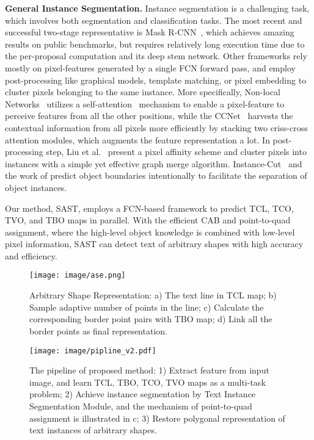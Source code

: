 \documentclass[sigconf]{acmart}
\begin{document}
\textbf{General Instance Segmentation.}
Instance segmentation is a challenging task, which involves both segmentation and classification tasks. 
The most recent and successful two-stage representative is Mask R-CNN~\cite{he2017mask}, which achieves amazing results on public benchmarks, but requires relatively long execution time due to the per-proposal computation and its deep stem network. Other frameworks rely mostly on pixel-features generated by a single FCN forward pass, and employ post-processing like graphical models, template matching, or pixel embedding to cluster pixels belonging to the same instance. More specifically, Non-local Networks~\cite{wang2018non} utilizes a self-attention~\cite{vaswani2017attention} mechanism to enable a pixel-feature to perceive features from all the other positions, while the CCNet~\cite{huang2018ccnet} harvests the contextual information from all pixels more efficiently by stacking two criss-cross attention modules, which augments the feature representation a lot. In post-processing step, Liu et al.~\cite{liu2018affinity} present a pixel affinity scheme and cluster pixels into instances with a simple yet effective graph merge algorithm. Instance-Cut~\cite{kirillov2017instancecut} and the work of \cite{yu2018learning} predict object boundaries intentionally to facilitate the separation of object instances.









Our method, SAST, employs a FCN-based framework to predict TCL, TCO, TVO, and TBO maps in parallel. With the efficient CAB and point-to-quad assignment, where the high-level object knowledge is combined with low-level pixel information, SAST can detect text of arbitrary shapes with high accuracy and efficiency.
\begin{figure}
  \texttt{[image: image/ase.png]}
  \caption{Arbitrary Shape Representation: a) The text line in TCL map; b) Sample adaptive number of points in the  line; c) Calculate the corresponding border point pairs with TBO map; d) Link all the border points as final representation. }
  \label{fig:ase}
\end{figure}



\begin{figure*}
\texttt{[image: image/pipline\_v2.pdf]}
  \caption{The pipeline of proposed method: 1) Extract feature from input image, and learn TCL, TBO, TCO, TVO maps as a multi-task problem; 2) Achieve instance segmentation by Text Instance Segmentation Module, and the mechanism of point-to-quad assignment is illustrated in c; 3) Restore polygonal representation of text instances of arbitrary shapes.}
  \label{fig:pipline}
\end{figure*}
\end{document}

